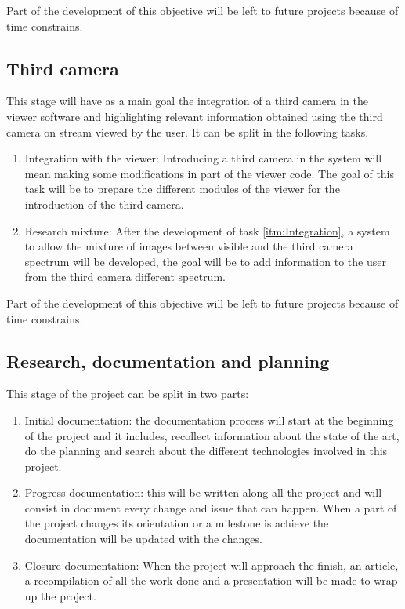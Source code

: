 \documentclass[10pt,a4paper,twocolumn,twoside]{article}
\begin{document}
Part of the development of this objective will be left to future projects because of time constrains.

\subsection{Third camera}
This stage will have as a main goal the integration of a third camera in the viewer software and highlighting relevant information obtained using the third camera on stream viewed by the user. It can be split in the following tasks.

\begin{enumerate}
	\item \label{itm:Integration} Integration with the viewer: Introducing a third camera in the system will mean making some modifications in part of the viewer code. The goal of this task will be to prepare the different modules of the viewer for the introduction of the third camera.
	
	\item Research mixture: After the development of task \ref{itm:Integration}, a system to allow the mixture of images between visible and the third camera spectrum will be developed, the goal will be to add information to the user from the third camera different spectrum.
\end{enumerate}

Part of the development of this objective will be left to future projects because of time constrains.


\subsection{Research, documentation and planning}
This stage of the project can be split in two parts:
\begin{enumerate}
	\item Initial documentation: the documentation process will start at the beginning of the project and it includes, recollect information about the state of the art, do the planning and search about the different technologies involved in this project. 
	
	\item Progress documentation: this will be written along all the project and will consist in document every change and issue that can happen. When a part of the project changes its orientation or a milestone is achieve the documentation will be updated with the changes. 
	
	\item Closure documentation: When the project will approach the finish, an article, a recompilation of all the work done and a presentation will be made to wrap up the project.
	
\end{enumerate}
\end{document}
